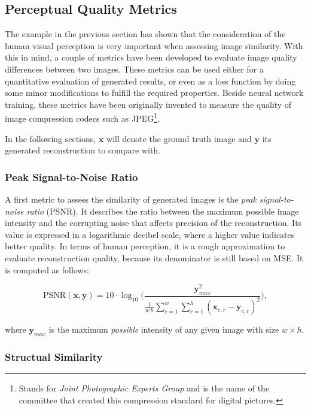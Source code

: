 \subsection{Perceptual Quality Metrics}

The example in the previous section has shown that the consideration of the human visual perception is very important when assessing image similarity. With this in mind, a couple of metrics have been developed to evaluate image quality differences between two images. These metrics can be used either for a quantitative evaluation of generated results, or even as a loss function by doing some minor modifications to fulfill the required properties. Beside neural network training, these metrics have been originally invented to measure the quality of image compression codecs such as JPEG\footnote{Stands for \textit{Joint Photographic Experts Group} and is the name of the committee that created this compression standard for digital pictures.}.

In the following sections, $ \textbf{x} $ will denote the ground truth image and $ \textbf{y} $ its generated reconstruction to compare with.

\subsubsection*{Peak Signal-to-Noise Ratio}

A first metric to assess the similarity of generated images is the \textit{peak signal-to-noise ratio} (PSNR). It describes the ratio between the maximum possible image intensity and the corrupting noise that affects precision of the reconstruction. Its value is expressed in a logarithmic decibel scale, where a higher value indicates better quality. In terms of human perception, it is a rough approximation to evaluate reconstruction quality, because its denominator is still based on MSE. It is computed as follows:

\begin{equation} \label{eq:psnr}
\textrm{PSNR}(\textbf{x}, \textbf{y}) = 10 \cdot \log_{10} \Bigg( \frac{\textbf{y}_{max}^2}{\frac{1}{w \, h} \sum_{c=1}^{w} \sum_{r=1}^{h} (\textbf{x}_{c,r} - \textbf{y}_{c,r})^2 } \Bigg) ,
\end{equation}

where $ \textbf{y}_{max} $ is the maximum \textit{possible} intensity of any given image with size $ w \times h $.


\subsubsection*{Structual Similarity}

